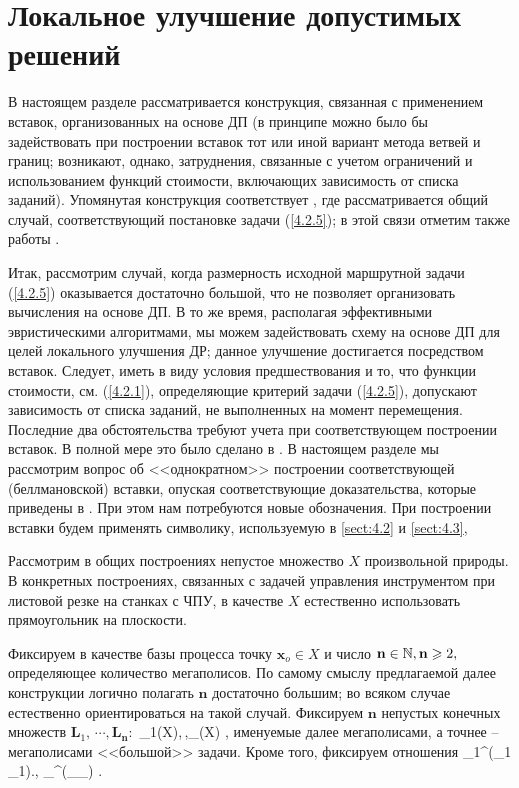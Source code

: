 

\section{
  Локальное улучшение допустимых решений
}
\label{sect:4.4}
\setcounter{equation}{0}

В настоящем разделе рассматривается конструкция, связанная с применением вставок,
организованных на основе ДП
(в принципе можно было бы задействовать при построении
вставок тот или иной вариант метода ветвей и границ;
возникают, однако, затруднения,
связанные с учетом ограничений и использованием функций стоимости, включающих
зависимость от списка заданий).
Упомянутая конструкция соответствует \cite{Cha13`},
где рассматривается общий случай, соответствующий постановке задачи (\ref{4.2.5});
в этой связи отметим также работы
\cite{Cha14`,Cha15`}.

Итак, рассмотрим случай,
когда размерность исходной маршрутной задачи (\ref{4.2.5})
оказывается достаточно большой,
что не позволяет организовать вычисления на основе ДП.
В то же время, располагая эффективными эвристическими алгоритмами,
мы можем задействовать схему на основе ДП для целей локального улучшения ДР;
данное улучшение достигается посредством  вставок.
Следует, иметь в виду условия предшествования и то,
что функции стоимости,
см. (\ref{4.2.1}),
определяющие критерий задачи (\ref{4.2.5}),
допускают зависимость от списка заданий,
не выполненных на момент перемещения.
Последние два обстоятельства требуют учета при соответствующем построении вставок.
В полной мере это было сделано в \cite{Cha13`, 15`}.
В настоящем разделе мы рассмотрим
вопрос об <<однократном>> построении соответствующей (беллмановской) вставки,
опуская соответствующие доказательства,
которые приведены в \cite{Cha13`, 15`}.
При этом нам потребуются новые обозначения.
При построении вставки будем применять
символику, используемую в
\ref{sect:4.2} и \ref{sect:4.3},

Рассмотрим в общих построениях непустое множество $X$
произвольной природы.
В конкретных построениях, связанных с задачей
управления инструментом при листовой резке на станках с ЧПУ,
в качестве $X$
естественно использовать прямоугольник на плоскости.

Фиксируем в качестве базы процесса точку
$\mathbf{x}_o\in X$ и число
$\mathbf{n}\in {\mathbb N}, \mathbf{n}\geqslant 2,$
определяющее количество мегаполисов.
По самому смыслу
предлагаемой далее конструкции логично полагать
$\mathbf{n}$ достаточно
большим;
во всяком случае естественно ориентироваться на такой случай.
Фиксируем $\mathbf{n}$ непустых конечных множеств
$\mathbf{L}_1,\,\cdots,\mathbf{L}_\mathbf{n}:$
\bfn
  \label{4.4.1}
  _1\in {}(X),\,\cdots,_\in {}(X)
  ,
\efn
именуемые далее мегаполисами,
а точнее --
мегаполисами <<большой>> задачи.
Кроме того, фиксируем отношения
\bfn
  \label{4.4.2}
  \bbl_1\in \cp^\prime(_1 \times {}_1).\cdots,
  \bbl_\in \cp^\prime(_\times {}_)
  .
\efn

